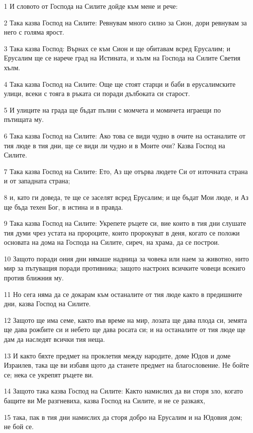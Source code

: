 \par 1 И словото от Господа на Силите дойде към мене и рече:
\par 2 Така казва Господ на Силите: Ревнувам много силно за Сион, дори ревнувам за него с голяма ярост.
\par 3 Така казва Господ: Върнах се към Сион и ще обитавам всред Ерусалим; и Ерусалим ще се нарече град на Истината, и хълм на Господа на Силите Светия хълм.
\par 4 Така казва Господ на Силите: Още ще стоят старци и баби в ерусалимските улици, всеки с тояга в ръката си поради дълбоката си старост.
\par 5 И улиците на града ще бъдат пълни с момчета и момичета играещи по пътищата му.
\par 6 Така казва Господ на Силите: Ако това се види чудно в очите на останалите от тия люде в тия дни, ще се види ли чудно и в Моите очи? Казва Господ на Силите.
\par 7 Така казва Господ на Силите: Ето, Аз ще отърва людете Си от източната страна и от западната страна;
\par 8 и, като ги доведа, те ще се заселят всред Ерусалим; и ще бъдат Мои люде, и Аз ще бъда техен Бог, в истина и в правда.
\par 9 Така казва Господ на Силите: Укрепете ръцете си, вие които в тия дни слушате тия думи чрез устата на пророците, които пророкуват в деня, когато се положи основата на дома на Господа на Силите, сиреч, на храма, да се построи.
\par 10 Защото поради ония дни нямаше надница за човека или наем за животно, нито мир за пътуващия поради противника; защото настроих всичките човеци всекиго против ближния му.
\par 11 Но сега няма да се докарам към останалите от тия люде както в предишните дни, казва Господ на Силите.
\par 12 Защото ще има семе, както във време на мир, лозата ще дава плода си, земята ще дава рожбите си и небето ще дава росата си; и на останалите от тия люде ще дам да наследят всички тия неща.
\par 13 И както бяхте предмет на проклетия между народите, доме Юдов и доме Израилев, така ще ви избавя щото да станете предмет на благословение. Не бойте се; нека се укрепят ръцете ви.
\par 14 Защото така казва Господ на Силите: Както намислих да ви сторя зло, когато бащите ви Ме разгневиха, казва Господ на Силите, и не се разкаях,
\par 15 така, пак в тия дни намислих да сторя добро на Ерусалим и на Юдовия дом; не бой се.
